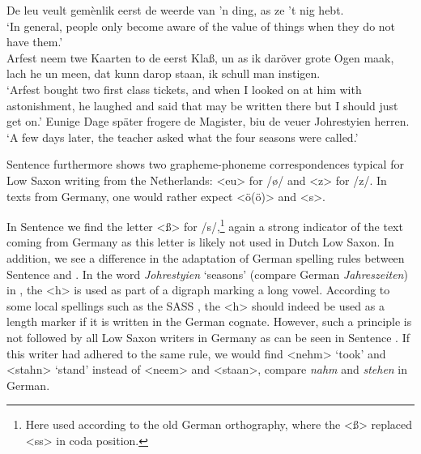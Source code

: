 \documentclass[output=paper,colorlinks,citecolor=brown]{langscibook}
\begin{document}
\ea\label{spelling_nwf} %
De leu veult gemènlik eerst de weerde van 'n ding, as ze 't nig hebt. \\
\glt `In general, people only become aware of the value of things when they do not have them.'\\
\ex\label{spelling_dns} %
Arfest neem twe Kaarten to de eerst Klaß, un as ik daröver grote Ogen maak, lach he un meen, dat kunn darop staan, ik schull man instigen. \\
\glt `Arfest bought two first class tickets, and when I looked on at him with astonishment, he laughed and said that may be written there but I should just get on.'
\ex\label{spelling_dwf} %
Eunige Dage später frogere de Magister, biu de veuer Johrestyien herren.\\
\glt `A few days later, the teacher asked what the four seasons were called.'
\z



Sentence  furthermore shows two grapheme-phoneme correspondences typical for Low Saxon writing from the Netherlands: <eu> for /ø/ and <z> for /z/. In texts from Germany, one would rather expect <ö(ö)> and <s>. 


In Sentence  we find the letter <ß> for /s/,\footnote{Here used according to the old German orthography, where the <ß> replaced <ss> in coda position.} again a strong indicator of the text coming from Germany as this letter is likely not used in Dutch Low Saxon. In addition, we see a difference in the adaptation of German spelling rules between Sentence  and . In the word \textit{Johrestyien} `seasons' (compare German \textit{Jahreszeiten}) in , the <h> is used as part of a digraph marking a long vowel. According to some local spellings such as the SASS \citep{KahlThies2009}, the <h> should indeed be used as a length marker if it is written in the German cognate. However, such a principle is not followed by all Low Saxon writers in Germany as can be seen in Sentence . If this writer had adhered to the same rule, we would find <nehm> `took' and <stahn> `stand' instead of <neem> and <staan>, compare \textit{nahm} and \textit{stehen} in German.
\end{document}

